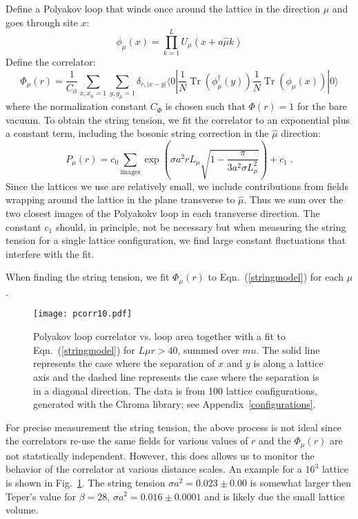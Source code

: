 \documentclass[preprint,aps,prd]{revtex4-2}
\newcommand{\be}{\begin{equation}}
\newcommand{\eq}{\end{equation}}
\DeclareMathOperator{\Tr}{Tr}
\begin{document}
Define a Polyakov loop that winds once around the lattice
in the direction $\mu$ and goes through site $x$:
\be
         \phi_\mu(x)= \prod_{k=1}^L U_\mu(x+a \hat{\mu} k)
\eq
Define the correlator:
\be
\Phi_\mu(r) = \frac{1}{C_\phi} \sum_{x, x_\mu=1} \sum_{y, y_\mu=1}
           \delta_{r,|x-y|}
           \langle 0 | \frac{1}{N} \Tr\left(\phi_\mu^\dagger(y)\right)
           \frac{1}{N} \Tr\left(\phi_\mu(x)\right) |0\rangle
           \label{pcorr}
\eq
%
where the normalization constant $C_\Phi$ is chosen such that
$\Phi(r)=1$ for the bare vacuum.  To obtain the string tension,
we fit the correlator to an exponential plus a constant term,
including the bosonic string correction in the $\hat{\mu}$
direction:
\be
P_\mu(r) = c_0 \sum_{\mbox{images}}
      \exp\left(\sigma a^2 r L_\mu\sqrt{1-\frac{\pi}{3 a^2 \sigma L_\mu^2}}\right)
      + c_1 \; .  \label{stringmodel}
\eq    
Since the lattices we use are relatively small, we include contributions from fields wrapping around the lattice in the plane transverse to $\hat{\mu}$.  Thus we sum over the two closest images of the Polyakokv loop in each transverse
direction.  The constant $c_1$ should, in principle, not be necessary but when measuring the string tension for a single lattice configuration, we find large constant fluctuations that interfere with the fit.

When finding the string tension, we fit $\Phi_\mu(r)$ to
Eqn.~(\ref{stringmodel}) for each $\mu$.

\begin{figure}
  \texttt{[image: pcorr10.pdf]}
  \caption{Polyakov loop correlator vs. loop area together with
    a fit to Eqn.~(\ref{stringmodel}) for $L\mu r>40$, summed over
    $mu$.  The solid line
    represents the case where the separation of $x$
    and $y$ is along a lattice axis and the dashed line
    represents the case where the separation is in
    a diagonal direction.  The data is from 100 lattice
    configurations, generated with the Chroma library;
    see Appendix~\ref{configurations}. \label{pcorr16}}
\end{figure}


For precise measurement the string tension, the above process is
not ideal since the correlators re-use the same fields for various
values of $r$ and the $\Phi_\mu(r)$ are not statstically independent.
However, this does allows us to monitor the behavior of the correlator at
various distance scales.  An example for a $16^3$ lattice is shown
in Fig.~\ref{pcorr16}.  The string tension $\sigma a^2 = 0.023 \pm 0.00$
is somewhat larger then Teper's value for $\beta=28$,
$\sigma a^2 = 0.016\pm 0.0001$ and is likely due the small lattice volume.
\end{document}
